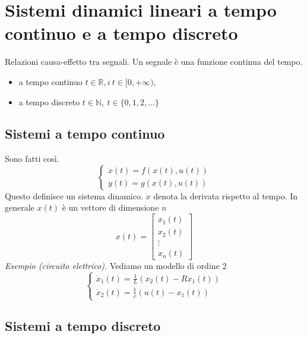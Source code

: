
\chapter{Sistemi dinamici lineari a tempo continuo e a tempo discreto}

Relazioni causa-effetto tra segnali. Un segnale è una funzione continua del tempo.
\begin{itemize}
	\item a tempo continuo $t\in \mathbb{R} ,i\ t\in [ 0,+\infty)$,
	\item a tempo discreto $t\in \mathbb{N} ,\ t\in \{0,1,2,\dotsc \}$
\end{itemize}

\section{Sistemi a tempo continuo}

Sono fatti così.
\begin{equation*}
	\boxed{
		\begin{cases}
			\dot{x} (t)=f(x(t),u(t)) \\
			y(t)=g(x(t),u(t))      
		\end{cases}
	}
\end{equation*}
Questo definisce un sistema dinamico. $\dot{x}$ denota la derivata rispetto al tempo. In generale $x(t)$ è un vettore di dimensione $n$
\begin{equation*}
	x(t) =\begin{bmatrix}
	x_1(t)\\
	x_2(t)\\
	\vdots \\
	x_n(t)
	\end{bmatrix}
\end{equation*}
\textit{Esempio (circuito elettrico).} Vediamo un modello di ordine 2
\begin{equation*}
	\begin{cases}
		\dot{x}_1 (t)=\frac{1}{L}(x_2 (t)-Rx_1 (t)) \\
		\dot{x}_2 (t)=\frac{1}{c}(u(t)-x_1 (t))       
	\end{cases}
\end{equation*}

\section{Sistemi a tempo discreto}

